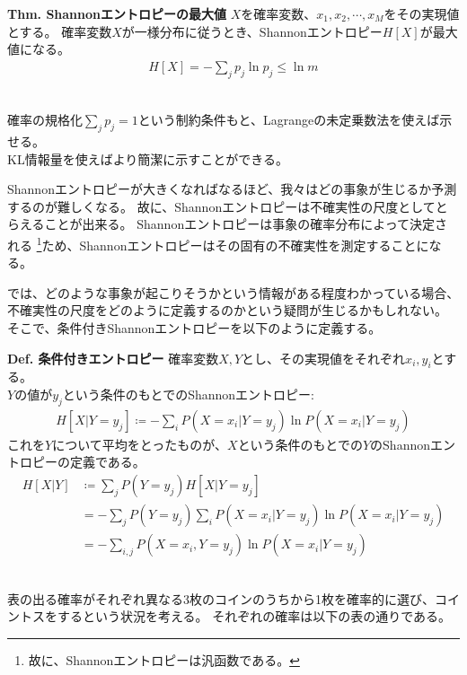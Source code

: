 \documentclass{ltjsarticle}
\begin{document}
\begin{itembox}[l]{\textbf{Thm. Shannonエントロピーの最大値}}
  $X$を確率変数、$x_1, x_2, \cdots, x_M$をその実現値とする。
  確率変数$X$が一様分布に従うとき、Shannonエントロピー$H[X]$が最大値になる。
  \begin{align*}
    H[X] = -\sum_j p_j \ln{p_j}\leq \ln{m}
  \end{align*}
\end{itembox}
\medskip
{}\\
確率の規格化$\sum_j p_j = 1$という制約条件もと、Lagrangeの未定乗数法を使えば示せる。\\
KL情報量を使えばより簡潔に示すことができる。

\medskip

Shannonエントロピーが大きくなればなるほど、我々はどの事象が生じるか予測するのが難しくなる。
故に、Shannonエントロピーは不確実性の尺度としてとらえることが出来る。
Shannonエントロピーは事象の確率分布によって決定される \footnote{故に、Shannonエントロピーは汎函数である。}ため、Shannonエントロピーはその固有の不確実性を測定することになる。

では、どのような事象が起こりそうかという情報がある程度わかっている場合、不確実性の尺度をどのように定義するのかという疑問が生じるかもしれない。\\
そこで、条件付きShannonエントロピーを以下のように定義する。

\begin{itembox}[l]{\textbf{Def. 条件付きエントロピー}}
  確率変数$X, Y$とし、その実現値をそれぞれ$x_i, y_i$とする。\\
  $Y$の値が$y_j$という条件のもとでのShannonエントロピー:
  \begin{align}
    H[X|Y=y_j] \coloneq - \sum_{i} P(X=x_i|Y=y_j) \ln{P(X=x_i|Y=y_j)}
  \end{align}
  これを$Y$について平均をとったものが、$X$という条件のもとでの$Y$のShannonエントロピーの定義である。
  \begin{align}
    H[X|Y] &\coloneq \sum_{j} P(Y=y_j) H[X|Y=y_j]\\
    &= - \sum_{j} P(Y=y_j) \sum_{i} P(X=x_i|Y=y_j) \ln{P(X=x_i|Y=y_j)}\\
    &= - \sum_{i, j} P(X=x_i, Y=y_j) \ln{P(X=x_i|Y=y_j)}
  \end{align}
\end{itembox}

\\
表の出る確率がそれぞれ異なる3枚のコインのうちから1枚を確率的に選び、コイントスをするという状況を考える。
それぞれの確率は以下の表の通りである。
\end{document}
